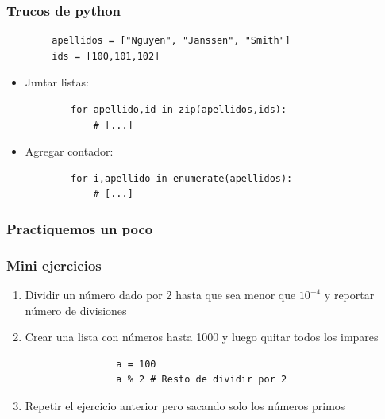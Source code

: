 \documentclass[14pt,aspectratio=169,xcolor=dvipsnames]{beamer}
\begin{document}
\begin{frame}[fragile]\frametitle{Trucos de python}
    \begin{verbatim}
        apellidos = ["Nguyen", "Janssen", "Smith"]
        ids = [100,101,102]
    \end{verbatim}
    \begin{itemize}
        \item Juntar listas:
        \begin{verbatim}
        for apellido,id in zip(apellidos,ids):
            # [...]
    \end{verbatim}
        \item Agregar contador:
    \begin{verbatim}
        for i,apellido in enumerate(apellidos):
            # [...]
    \end{verbatim}
    \end{itemize}
\end{frame}
\begin{frame}\frametitle{Practiquemos un poco}
\end{frame}
\begin{frame}
    \maketitle
\end{frame}
\begin{frame}[fragile]\frametitle{Mini ejercicios}
    \begin{enumerate}
        \item Dividir un número dado por 2 hasta que sea menor que $10^{-4}$ y reportar número de divisiones
        \item Crear una lista con números hasta 1000 y luego quitar todos los impares   
            \begin{verbatim}
                a = 100
                a % 2 # Resto de dividir por 2
            \end{verbatim}
        \item Repetir el ejercicio anterior pero sacando solo los números primos
    \end{enumerate}
\end{frame}
\end{document}
